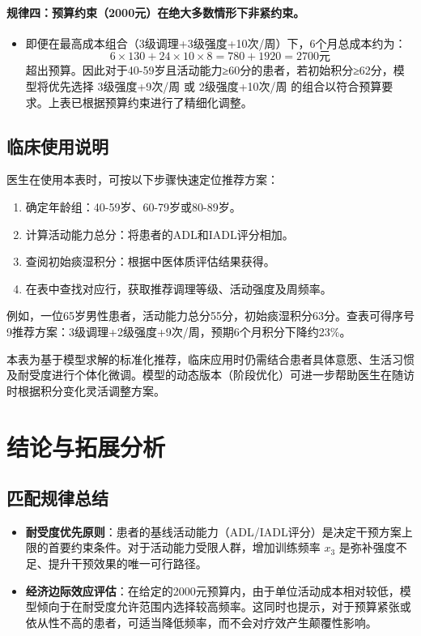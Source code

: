\documentclass[12pt,a4paper]{article}
\begin{document}
\paragraph{规律四：预算约束（2000元）在绝大多数情形下非紧约束。}
\begin{itemize}
    \item 即便在最高成本组合（3级调理+3级强度+10次/周）下，6个月总成本约为：
\begin{equation}
6 \times 130 + 24 \times 10 \times 8 = 780 + 1920 = 2700 \text{元}
\end{equation}
超出预算。因此对于40-59岁且活动能力≥60分的患者，若初始积分≥62分，模型将优先选择 3级强度+9次/周 或 2级强度+10次/周 的组合以符合预算要求。上表已根据预算约束进行了精细化调整。
\end{itemize}

\subsection{临床使用说明}
医生在使用本表时，可按以下步骤快速定位推荐方案：
\begin{enumerate}
    \item 确定年龄组：40-59岁、60-79岁或80-89岁。
    \item 计算活动能力总分：将患者的ADL和IADL评分相加。
    \item 查阅初始痰湿积分：根据中医体质评估结果获得。
    \item 在表中查找对应行，获取推荐调理等级、活动强度及周频率。
\end{enumerate}

例如，一位65岁男性患者，活动能力总分55分，初始痰湿积分63分。查表可得序号9推荐方案：3级调理+2级强度+9次/周，预期6个月积分下降约23\%。

本表为基于模型求解的标准化推荐，临床应用时仍需结合患者具体意愿、生活习惯及耐受度进行个体化微调。模型的动态版本（阶段优化）可进一步帮助医生在随访时根据积分变化灵活调整方案。

\section{结论与拓展分析}

\subsection{匹配规律总结}
\begin{itemize}
    \item \textbf{耐受度优先原则}：患者的基线活动能力（ADL/IADL评分）是决定干预方案上限的首要约束条件。对于活动能力受限人群，增加训练频率 $x_3$ 是弥补强度不足、提升干预效果的唯一可行路径。
    \item \textbf{经济边际效应评估}：在给定的2000元预算内，由于单位活动成本相对较低，模型倾向于在耐受度允许范围内选择较高频率。这同时也提示，对于预算紧张或依从性不高的患者，可适当降低频率，而不会对疗效产生颠覆性影响。
\end{itemize}
\end{document}
